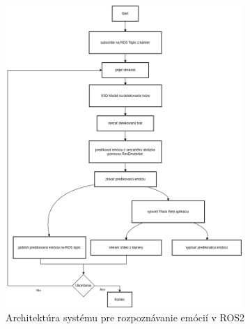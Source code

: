 \begin{figure}[!htpb]
    \centering
    \includegraphics[width=0.8\textwidth]{img/predikovanie_diagram.png}
    \caption{Architektúra systému pre rozpoznávanie emócií v ROS2}
    \label{fig:ros2_architecture}
\end{figure}


